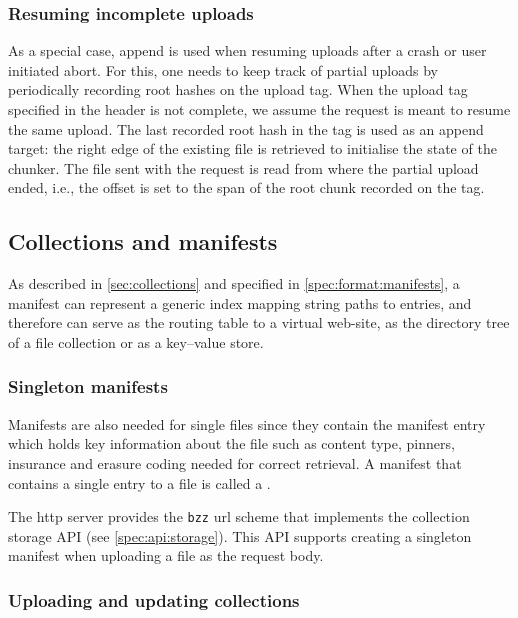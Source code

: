\subsubsection{Resuming incomplete uploads}\label{sec:resume}

As a special case, append is used when resuming uploads after a crash or user initiated abort. For this, one needs to keep track of partial uploads by periodically recording root hashes on the upload tag. When the upload tag specified in the header is not complete, we assume the request is meant to resume the same upload. The last recorded root hash in the tag is used as an append target: the right edge of the existing file is retrieved to initialise the state of the chunker. The file sent with the request is read from where the partial upload ended, i.e., the offset is set to the span of the root chunk recorded on the tag.

\subsection{Collections and manifests}\label{sec:manifests-ux}

As described in \ref{sec:collections} and specified in \ref{spec:format:manifests}, a manifest can represent a generic index mapping string paths to entries, and therefore can serve as the routing table to a virtual web-site, as the directory tree of a file collection or as a key--value store. 

\subsubsection{Singleton manifests}

Manifests are also needed for single files since they contain the manifest entry which holds key information about the file such as content type, pinners, insurance and erasure coding needed for correct retrieval. A manifest that contains a single entry to a file is called a .

The http server provides the \texttt{bzz} url scheme that implements the collection storage API (see  \ref{spec:api:storage}). This API supports creating a singleton manifest when uploading a file as the request body. 

\subsubsection{Uploading and updating collections}

